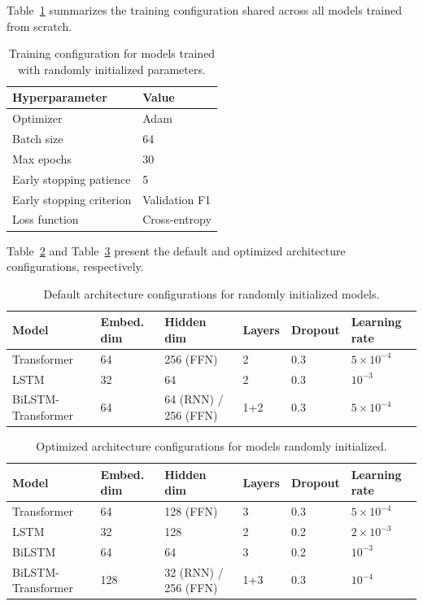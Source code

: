 \documentclass{article}
\theoremstyle{plain}
\theoremstyle{definition}
\theoremstyle{remark}
\begin{document}
Table~\ref{tab:dl_training} summarizes the training configuration shared across all models trained from scratch.

\begin{table}[h]
\centering
\caption{Training configuration for models trained with randomly initialized parameters.}
\label{tab:dl_training}
\begin{tabular}{ll}
\toprule
Hyperparameter & Value \\
\midrule
Optimizer & Adam \\
Batch size & 64 \\
Max epochs & 30 \\
Early stopping patience & 5 \\
Early stopping criterion & Validation F1 \\
Loss function & Cross-entropy \\
\bottomrule
\end{tabular}
\end{table}

Table~\ref{tab:dl_default_config} and Table~\ref{tab:dl_optimal_config} present the default and optimized architecture configurations, respectively.

\begin{table}[h]
\centering
\caption{Default architecture configurations for randomly initialized models.}
\label{tab:dl_default_config}
\begin{tabular}{llllll}
\toprule
Model & Embed. dim & Hidden dim & Layers & Dropout & Learning rate \\
\midrule
Transformer & 64 & 256 (FFN) & 2 & 0.3 & $5 \times 10^{-4}$ \\
LSTM & 32 & 64 & 2 & 0.3 & $10^{-3}$ \\
BiLSTM-Transformer & 64 & 64 (RNN) / 256 (FFN) & 1+2 & 0.3 & $5 \times 10^{-4}$ \\
\bottomrule
\end{tabular}
\end{table}

\begin{table}[h]
\centering
\caption{Optimized architecture configurations for models randomly initialized.}
\label{tab:dl_optimal_config}
\begin{tabular}{llllll}
\toprule
Model & Embed. dim & Hidden dim & Layers & Dropout & Learning rate \\
\midrule
Transformer & 64 & 128 (FFN) & 3 & 0.3 & $5 \times 10^{-4}$ \\
LSTM & 32 & 128 & 2 & 0.2 & $2 \times 10^{-3}$ \\
BiLSTM & 64 & 64 & 3 & 0.2 & $10^{-3}$ \\
BiLSTM-Transformer & 128 & 32 (RNN) / 256 (FFN) & 1+3 & 0.3 & $10^{-4}$ \\
\bottomrule
\end{tabular}
\end{table}
\end{document}
